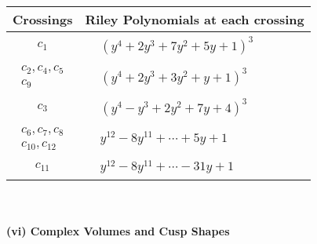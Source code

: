 \documentclass[1p]{elsarticle_modified}
\theoremstyle{definition}
\begin{document}
\begin{tabular}{m{50pt}|m{274pt}}
Crossings & \hspace{64pt}Riley Polynomials at each crossing \\
\hline $$\begin{aligned}c_{1}\end{aligned}$$&$\begin{aligned}
&(y^4+2 y^3+7 y^2+5 y+1)^3
\end{aligned}$\\
\hline $$\begin{aligned}c_{2},c_{4},c_{5}\\c_{9}\end{aligned}$$&$\begin{aligned}
&(y^4+2 y^3+3 y^2+y+1)^3
\end{aligned}$\\
\hline $$\begin{aligned}c_{3}\end{aligned}$$&$\begin{aligned}
&(y^4- y^3+2 y^2+7 y+4)^3
\end{aligned}$\\
\hline $$\begin{aligned}c_{6},c_{7},c_{8}\\c_{10},c_{12}\end{aligned}$$&$\begin{aligned}
&y^{12}-8 y^{11}+\cdots+5 y+1
\end{aligned}$\\
\hline $$\begin{aligned}c_{11}\end{aligned}$$&$\begin{aligned}
&y^{12}-8 y^{11}+\cdots-31 y+1
\end{aligned}$\\
\hline
\end{tabular}\\~\\
\newpage\flushleft \textbf{(vi) Complex Volumes and Cusp Shapes}
\end{document}

